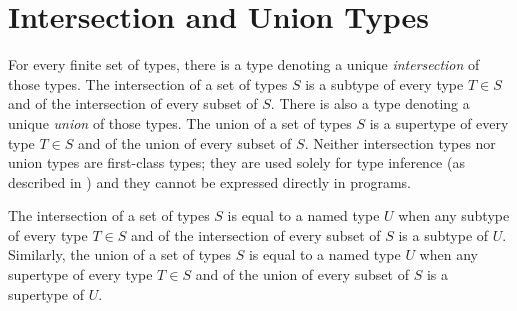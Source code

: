\section{Intersection and Union Types}

For every finite set of types, there is a type denoting a unique
\emph{intersection} of those types.
The intersection of a set of types $S$ is a subtype of every type $T \in S$
and of the intersection of every subset of $S$.
There is also a type denoting a unique \emph{union}
of those types. The union of a set of types $S$ is a supertype of every
type $T \in S$ and of the union of every subset of $S$.
Neither intersection types nor union types are first-class types;
they are used solely for type inference (as described in
  ) and
they cannot be expressed directly in programs.

The intersection of a set of types $S$ is equal to a named type $U$ when
any subtype of every type $T \in S$ and of the intersection of every
subset of $S$ is a subtype of $U$.
Similarly, the union of a set of types $S$ is equal to a named type $U$ when
any supertype of every type $T \in S$ and of the union of every
subset of $S$ is a supertype of $U$.

